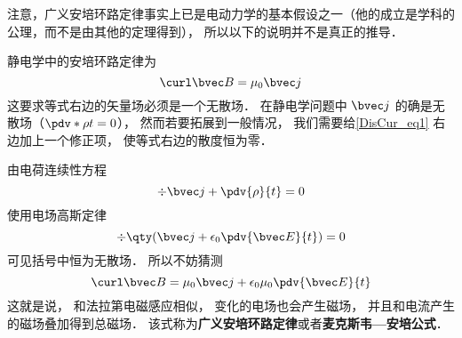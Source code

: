 注意，广义安培环路定律事实上已是电动力学的基本假设之一（他的成立是学科的公理，而不是由其他的定理得到）， 所以以下的说明并不是真正的推导．

静电学中的安培环路定律为
\begin{equation}\label{DisCur_eq1}
\curl\bvec B = \mu_0\bvec j
\end{equation}
这要求等式右边的矢量场必须是一个无散场． 在静电学问题中 $\bvec j$ 的确是无散场（$\pdv*{\rho}{t} = 0$）， 然而若要拓展到一般情况， 我们需要给\autoref{DisCur_eq1} 右边加上一个修正项， 使等式右边的散度恒为零．

由电荷连续性方程
\begin{equation}
\div \bvec j + \pdv{\rho}{t} = 0
\end{equation}
使用电场高斯定律
\begin{equation}
\div \qty(\bvec j + \epsilon_0\pdv{\bvec E}{t}) = 0
\end{equation}
可见括号中恒为无散场． 所以不妨猜测
\begin{equation}
\curl\bvec B = \mu_0\bvec j + \epsilon_0\mu_0\pdv{\bvec E}{t}
\end{equation}
这就是说， 和法拉第电磁感应相似， 变化的电场也会产生磁场， 并且和电流产生的磁场叠加得到总磁场． 该式称为\textbf{广义安培环路定律}或者\textbf{麦克斯韦—安培公式}．

